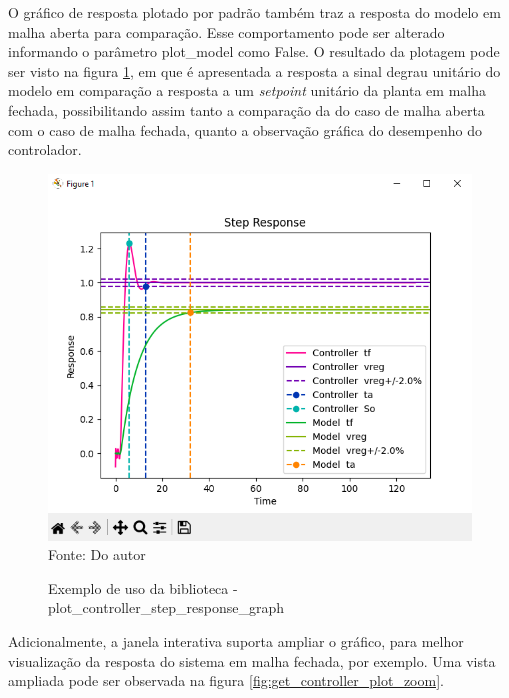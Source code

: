 O gráfico de resposta plotado por padrão também traz a resposta do modelo em malha aberta para comparação.
Esse comportamento pode ser alterado informando o parâmetro plot\_model como False.
O resultado da plotagem pode ser visto na figura \ref{fig:get_controller_plot}, em que é apresentada a resposta a sinal
degrau unitário do modelo em comparação a resposta a um \textit{setpoint} unitário da planta em malha fechada,
possibilitando assim tanto a comparação da do caso de malha aberta com o caso de malha fechada, quanto a observação
gráfica do desempenho do controlador.

\begin{figure}[H]
    \centering
    \caption{Exemplo de uso da biblioteca - plot\_controller\_step\_response\_graph}
    \includegraphics[scale=0.6]{figuras/get_controller_plot}
    \label{fig:get_controller_plot}
    \\
    \vspace{0cm}\hspace{0cm}\small{Fonte: Do autor}
\end{figure}

Adicionalmente, a janela interativa suporta ampliar o gráfico, para melhor visualização da resposta do sistema em
malha fechada, por exemplo.
Uma vista ampliada pode ser observada na figura \ref{fig:get_controller_plot_zoom}.

